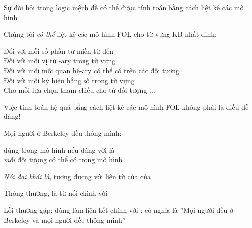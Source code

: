 \documentclass{article}
\begin{document}
\begin{huge}

Sự đòi hỏi trong logic mệnh đề có thể được tính toán bằng cách liệt kê các mô hình

Chúng tôi \emph{có thể} liệt kê các mô hình FOL cho từ vựng KB nhất định:

Đối với mỗi số phần tử miền  từ  đến \mat{$\infty$}\\
\tab Đối với mỗi vị từ -ary  trong từ vựng\\
\tab\tab Đối với mỗi mối quan hệ-ary  có thể có trên các đối tượng \\
\tab\tab\tab Đối với mỗi ký hiệu hằng số  trong từ vựng\\
\tab\tab\tab\tab Cho mỗi lựa chọn tham chiếu cho  từ  đối tượng $\ldots$

Việc tính toán hệ quả bằng cách liệt kê các mô hình FOL không phải là điều dễ dàng!





Mọi người ở Berkeley đều thông minh:\\

\quad đúng trong mô hình  nếu  đúng với  là \\
\emph{mỗi} đối tượng có thể có trong mô hình

\emph{Nói đại khái là}, tương đương với liên từ \note{} của  của 



Thông thường, \mat{$\implies$} là từ nối chính với \mat{$\forall$}

Lỗi thường gặp: dùng \mat{$\land$} làm liên kết chính với \mat{$\forall$}:
có nghĩa là ''Mọi người đều ở Berkeley và mọi người đều thông minh''




\end{huge}
\end{document}

